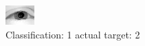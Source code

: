\begin{figure}[h!]
\begin{center}
\includegraphics[width=0.60\columnwidth]{figures/ID2358_class_1_target_2.png}
\end{center}
\caption{ Classification: 1 actual target: 2}
\label{fig:ID2358_class_1_target_2}
\end{figure}
